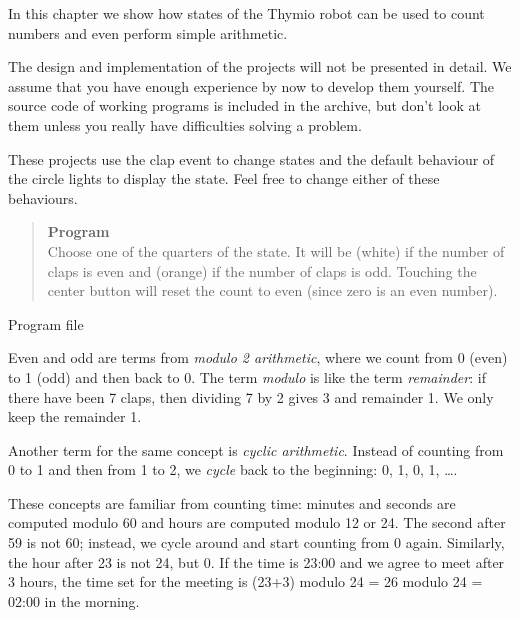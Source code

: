 
\label{ch.counting}

In this chapter we show how states of the Thymio robot can be used to
count numbers and even perform simple arithmetic.

The design and implementation of the projects will not be presented
in detail. We assume that you have enough experience by now to develop
them yourself. The source code of working programs is included in the
archive, but don't look at them unless you really have difficulties
solving a problem.

These projects use the clap event  to change states
and the default behaviour of the circle lights to display the state.
Feel free to change either of these behaviours.




\begin{quote}
\textbf{Program}\\Choose one of the quarters of the state.
It will be  (white) if the number of claps
is even and  (orange) if the number of claps is odd.
Touching the center button will reset the count to even
(since zero is an even number).
\end{quote}

{\raggedleft \hfill Program file }

Even and odd are terms from \emph{modulo 2 arithmetic}, where we count
from 0 (even) to 1 (odd) and then back to 0. The term \emph{modulo} is
like the term \emph{remainder}: if there have been 7 claps, then
dividing 7 by 2 gives 3 and remainder 1. We only keep the remainder 1.

Another term for the same concept is \emph{cyclic arithmetic}.
Instead of counting from 0 to 1 and then from 1 to 2,
we \emph{cycle} back to the beginning:
0, 1, 0, 1, \ldots.

These concepts are familiar from counting time: minutes and seconds are
computed modulo 60 and hours are computed modulo 12 or 24. The second
after 59 is not 60; instead, we cycle around and start counting from 0
again. Similarly, the hour after 23 is not 24, but 0. If the time is
23:00 and we agree to meet after 3 hours, the time set for the meeting
is (23+3) modulo 24 = 26 modulo 24 = 02:00 in the morning.

